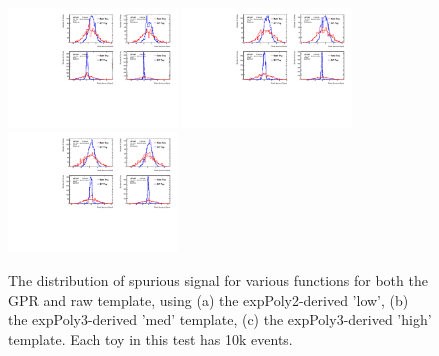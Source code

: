 \begin{figure} 
\begin{center}
  \includegraphics[width=0.4\textwidth]{figures/background/gpr/validation/nominal/ToyTest_FitSigVals_lowpT_10k_noSig}   
  \includegraphics[width=0.4\textwidth]{figures/background/gpr/validation/nominal/ToyTest_FitSigVals_medpT_10k_noSig}   
  \includegraphics[width=0.4\textwidth]{figures/background/gpr/validation/nominal/ToyTest_FitSigVals_highpT_10k_noSig}   
\caption{The distribution of spurious signal for various functions for both the GPR and raw template, using (a) the expPoly2-derived 'low', (b) the expPoly3-derived 'med' template, (c) the expPoly3-derived 'high' template. Each toy in this test has 10k events.}
\label{fig:lowpt_10k_noSig}
\end{center}
\end{figure}


